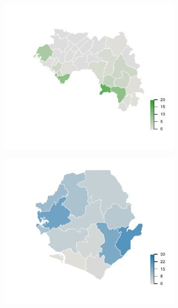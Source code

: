 	\begin{figure}[!p]
		\begin{subfigure}[b]{0.45\textwidth}
			\centering
			\includegraphics[width=\columnwidth]{figures/special-subbig-geo-1}
		\end{subfigure}		
		\hfill
		\begin{subfigure}[b]{0.45\textwidth}
			\centering
			\includegraphics[width=\columnwidth]{figures/special-subbig-geo-2}

\end{subfigure}
\end{figure}
